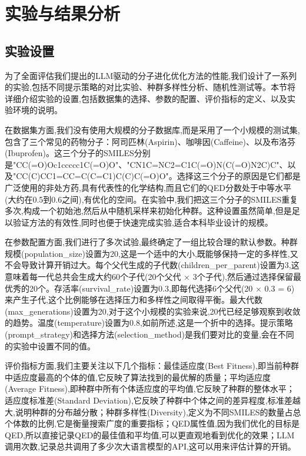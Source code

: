 \chapter{实验与结果分析}

\section{实验设置}

为了全面评估我们提出的LLM驱动的分子进化优化方法的性能,我们设计了一系列的实验,包括不同提示策略的对比实验、种群多样性分析、随机性测试等。本节将详细介绍实验的设置,包括数据集的选择、参数的配置、评价指标的定义、以及实验环境的说明。

在数据集方面,我们没有使用大规模的分子数据库,而是采用了一个小规模的测试集,包含了三个常见的药物分子：阿司匹林(Aspirin)、咖啡因(Caffeine)、以及布洛芬(Ibuprofen)。这三个分子的SMILES分别是"CC(=O)Oc1ccccc1C(=O)O"、"CN1C=NC2=C1C(=O)N(C(=O)N2C)C"、以及"CC(C)CC1=CC=C(C=C1)C(C)C(=O)O"。选择这三个分子的原因是它们都是广泛使用的非处方药,具有代表性的化学结构,而且它们的QED分数处于中等水平(大约在0.5到0.6之间),有优化的空间。在实验中,我们把这三个分子的SMILES重复多次,构成一个初始池,然后从中随机采样来初始化种群。这种设置虽然简单,但是足以验证方法的有效性,同时也便于快速完成实验,适合本科毕业设计的规模。

在参数配置方面,我们进行了多次试验,最终确定了一组比较合理的默认参数。种群规模(population\_size)设置为20,这是一个适中的大小,既能够保持一定的多样性,又不会导致计算开销过大。每个父代生成的子代数(children\_per\_parent)设置为3,这意味着每一代总共会生成大约60个子代(20个父代 $\times$ 3个子代),然后通过选择保留最优秀的20个。存活率(survival\_rate)设置为0.3,即每代选择6个父代(20 $\times$ 0.3 = 6)来产生子代,这个比例能够在选择压力和多样性之间取得平衡。最大代数(max\_generations)设置为20,对于这个小规模的实验来说,20代已经足够观察到收敛的趋势。温度(temperature)设置为0.8,如前所述,这是一个折中的选择。提示策略(prompt\_strategy)和选择方法(selection\_method)是我们要对比的变量,会在不同的实验中设置不同的值。

评价指标方面,我们主要关注以下几个指标：最佳适应度(Best Fitness),即当前种群中适应度最高的个体的值,它反映了算法找到的最优解的质量；平均适应度(Average Fitness),即种群中所有个体适应度的平均值,它反映了种群的整体水平；适应度标准差(Standard Deviation),它反映了种群中个体之间的差异程度,标准差越大,说明种群的分布越分散；种群多样性(Diversity),定义为不同SMILES的数量占总个体数的比例,它是衡量搜索广度的重要指标；QED属性值,因为我们优化的目标是QED,所以直接记录QED的最佳值和平均值,可以更直观地看到优化的效果；LLM调用次数,记录总共调用了多少次大语言模型的API,这可以用来评估计算的开销。

